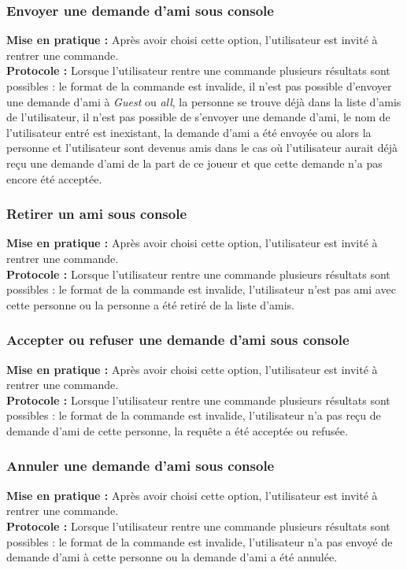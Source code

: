 \documentclass[10pt, a4paper]{article}
\begin{document}
\subsubsection{Envoyer une demande d'ami sous console}
\textbf{Mise en pratique :} Après avoir choisi cette option, l'utilisateur est invité à rentrer une commande. \\
\textbf{Protocole :} Lorsque l'utilisateur rentre une commande plusieurs résultats sont possibles : le format de la commande est invalide, il n'est pas possible d'envoyer une demande d'ami à \textit{Guest} ou \textit{all}, la personne se trouve déjà dans la liste d'amis de l'utilisateur, il n'est pas possible de s'envoyer une demande d'ami, le nom de l'utilisateur entré est inexistant, la demande d'ami a été envoyée ou alors la personne et l'utilisateur sont devenus amis dans le cas où l'utilisateur aurait déjà reçu une demande d'ami de la part de ce joueur et que cette demande n'a pas encore été acceptée. \\

\subsubsection{Retirer un ami sous console}
\textbf{Mise en pratique :} Après avoir choisi cette option, l'utilisateur est invité à rentrer une commande. \\
\textbf{Protocole :} Lorsque l'utilisateur rentre une commande plusieurs résultats sont possibles : le format de la commande est invalide, l'utilisateur n'est pas ami avec cette personne ou la personne a été retiré de la liste d'amis. \\

\subsubsection{Accepter ou refuser une demande d'ami sous console}
\textbf{Mise en pratique :} Après avoir choisi cette option, l'utilisateur est invité à rentrer une commande. \\
\textbf{Protocole :} Lorsque l'utilisateur rentre une commande plusieurs résultats sont possibles : le format de la commande est invalide, l'utilisateur n'a pas reçu de demande d'ami de cette personne, la requête a été acceptée ou refusée. \\

\subsubsection{Annuler une demande d'ami sous console}
\textbf{Mise en pratique :} Après avoir choisi cette option, l'utilisateur est invité à rentrer une commande. \\
\textbf{Protocole :} Lorsque l'utilisateur rentre une commande plusieurs résultats sont possibles : le format de la commande est invalide, l'utilisateur n'a pas envoyé de demande d'ami à cette personne ou la demande d'ami a été annulée. \\
\end{document}
